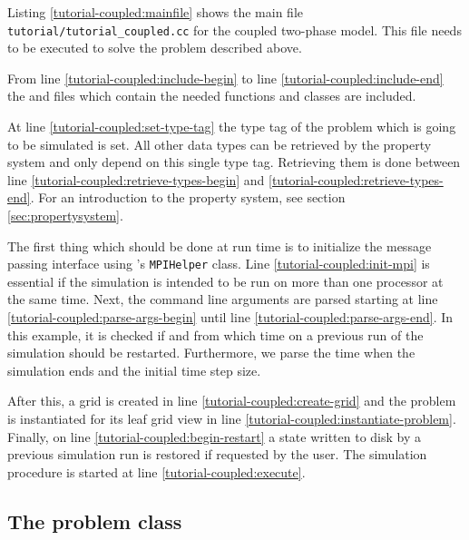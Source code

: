 Listing \ref{tutorial-coupled:mainfile} shows the main file
\texttt{tutorial/tutorial\_coupled.cc} for the coupled two-phase
model. This file needs to be executed to solve the problem described
above.

\begin{lst}\label{tutorial-coupled:mainfile} \mbox{}
  
\end{lst}

From line \ref{tutorial-coupled:include-begin} to line
\ref{tutorial-coupled:include-end} the \Dune and \Dumux files which
contain the needed functions and classes are included.

At line \ref{tutorial-coupled:set-type-tag} the type tag of the
problem which is going to be simulated is set. All other data types
can be retrieved by the \Dumux property system and only depend on this
single type tag. Retrieving them is done between line
\ref{tutorial-coupled:retrieve-types-begin} and
\ref{tutorial-coupled:retrieve-types-end}. For an introduction to the
property system, see section \ref{sec:propertysystem}.

The first thing which should be done at run time is to initialize the
message passing interface using \Dune's \texttt{MPIHelper} class. Line
\ref{tutorial-coupled:init-mpi} is essential if the simulation is
intended to be run on more than one processor at the same time. Next,
the command line arguments are parsed starting at line
\ref{tutorial-coupled:parse-args-begin} until line
\ref{tutorial-coupled:parse-args-end}. In this example, it is checked if and
from which time on a previous run of the simulation should be restarted. Furthermore, we
parse the time when the simulation ends and the initial time step size.

After this, a grid is created in line
\ref{tutorial-coupled:create-grid} and the problem is instantiated for
its leaf grid view in line \ref{tutorial-coupled:instantiate-problem}.
Finally, on line \ref{tutorial-coupled:begin-restart} a state written to
disk by a previous simulation run is restored if requested by the user.
The simulation procedure is started at line
\ref{tutorial-coupled:execute}.

\subsection{The problem class}

